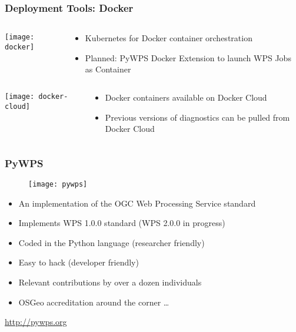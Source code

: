 \documentclass{beamer}
\begin{document}
\begin{frame}
\frametitle<presentation>{Deployment Tools: Docker}

  \begin{columns}[c]
    \begin{column}{.2\textwidth}
      \texttt{[image: docker]}
    \end{column}
    \begin{column}{.8\textwidth}
      \begin{itemize}
        \item Kubernetes for Docker container orchestration
        \item Planned: PyWPS Docker Extension to launch WPS Jobs as Container
      \end{itemize}
    \end{column}
  \end{columns}
  \vrule
  \begin{columns}[c]
    \begin{column}{.2\textwidth}
      \texttt{[image: docker-cloud]}
    \end{column}
    \begin{column}{.8\textwidth}
      \begin{itemize}
        \item Docker containers available on Docker Cloud
        \item Previous versions of diagnostics can be pulled from Docker Cloud
      \end{itemize}
    \end{column}
  \end{columns}

\end{frame}

\begin{frame}
\frametitle<presentation>{PyWPS}

  \begin{figure}[ht]
    \centering
    \texttt{[image: pywps]}
  \end{figure}

  \begin{itemize}
    \item An implementation of the OGC Web Processing Service standard
    \item Implements WPS 1.0.0 standard (WPS 2.0.0 in progress)
    \item Coded in the Python language (researcher friendly)
    \item Easy to hack (developer friendly)
    \item Relevant contributions by over a dozen individuals
    \item OSGeo accreditation around the corner \ldots
  \end{itemize}

  \vspace{0.2cm}
  \centering
  \footnotesize{\url{http://pywps.org}}

\end{frame}
\end{document}
